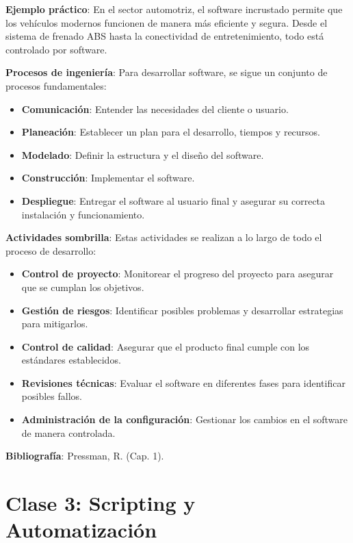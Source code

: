 \documentclass[a4paper,11pt]{article}
\begin{document}
\textbf{Ejemplo práctico}: En el sector automotriz, el software incrustado permite que los vehículos modernos funcionen de manera más eficiente y segura. Desde el sistema de frenado ABS hasta la conectividad de entretenimiento, todo está controlado por software.

\textbf{Procesos de ingeniería}: Para desarrollar software, se sigue un conjunto de procesos fundamentales:
\begin{itemize}
    \item \textbf{Comunicación}: Entender las necesidades del cliente o usuario.
    \item \textbf{Planeación}: Establecer un plan para el desarrollo, tiempos y recursos.
    \item \textbf{Modelado}: Definir la estructura y el diseño del software.
    \item \textbf{Construcción}: Implementar el software.
    \item \textbf{Despliegue}: Entregar el software al usuario final y asegurar su correcta instalación y funcionamiento.
\end{itemize}

\newpage

\textbf{Actividades sombrilla}: Estas actividades se realizan a lo largo de todo el proceso de desarrollo:
\begin{itemize}
    \item \textbf{Control de proyecto}: Monitorear el progreso del proyecto para asegurar que se cumplan los objetivos.
    \item \textbf{Gestión de riesgos}: Identificar posibles problemas y desarrollar estrategias para mitigarlos.
    \item \textbf{Control de calidad}: Asegurar que el producto final cumple con los estándares establecidos.
    \item \textbf{Revisiones técnicas}: Evaluar el software en diferentes fases para identificar posibles fallos.
    \item \textbf{Administración de la configuración}: Gestionar los cambios en el software de manera controlada.
\end{itemize}

\textbf{Bibliografía}: Pressman, R. (Cap. 1).

\newpage

\section*{Clase 3: Scripting y Automatización}
\end{document}
